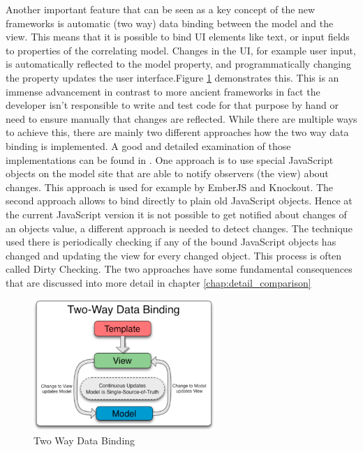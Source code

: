 Another important feature that can be seen as a key concept of the new frameworks is automatic (two way) data binding between the model and the view.
This means that it is possible to bind UI elements like text, or input fields to properties of the correlating model.
Changes in the UI, for example user input, is automatically reflected to the model property, and programmatically changing the property updates the user interface.Figure \ref{fig:data-binding} demonstrates this.
This is an immense advancement in contrast to more ancient frameworks in fact the developer isn't responsible to write and test code for that purpose by hand or need to ensure manually that changes are reflected.
While there are multiple ways to achieve this, there are mainly two different approaches how the two way data binding is implemented.
A good and detailed examination of those implementations can be found in \autocite[]{binding_comparison}.
One approach is to use special JavaScript objects on the model site that are able to notify observers (the view) about changes.
This approach is used for example by EmberJS and Knockout.
The second approach allows to bind directly to plain old JavaScript objects.
Hence at the current JavaScript version it is not possible to get notified about changes of an objects value, a different approach is needed to detect changes.
The technique used there is periodically checking if any of the bound JavaScript objects has changed and updating the view for every changed object.
This process is often called Dirty Checking.
The two approaches have some fundamental consequences that are discussed into more detail in chapter \ref{chap:detail_comparison}

\begin{figure}
	\centering \includegraphics[width=0.61\textwidth]{./img/web-dev/data-binding.png}
	\caption{Two Way Data Binding \autocite{ng-binding}}
	\label{fig:data-binding}
\end{figure}

